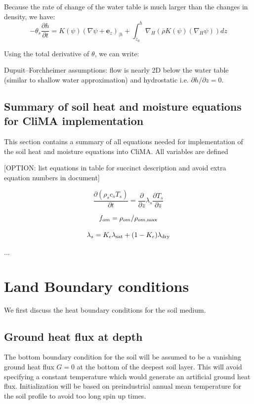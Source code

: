 \documentclass{article}
\begin{document}
Because the rate of change of the water table is much larger than the changes in density, we have: 
\begin{equation}
-	\theta_s \frac{\partial h}{\partial t} = 
 K(\psi) \left(\nabla \psi + {\mathbf e_z} \right)_{|h}  + \int_{z_0}^h  \nabla_H \left( {\overline \rho} K(\psi) \left(\nabla_H \psi \right) \right) dz
\end{equation}

Using the total derivative of $\theta$, we can write:


Dupuit–Forchheimer assumptions: flow is nearly 2D below the water table (similar to shallow water approximation) and hydrostatic i.e. $\partial h/\partial z=0$.

\subsection{Summary of soil heat and moisture equations for CliMA implementation}

This section contains a summary of all equations needed for implementation of the soil heat and moisture equations into CliMA. All variables are defined 

[OPTION: list equations in table for succinct description and avoid extra equation numbers in document]


\begin{equation}
     \frac{\partial (\rho_s c_s T_s) }{\partial t} = \frac{\partial }{\partial z}\lambda_s \frac{\partial T_s }{\partial z}
\end{equation}

\begin{equation}
    f_{om} = \rho_{om}/\rho_{om,{\rm max}}
\end{equation}


\begin{equation}
\lambda_s = K_e \lambda_{\rm sat} + (1-K_e) \lambda_{\rm dry}
\end{equation}


...



\section{Land Boundary conditions}
We first discuss the heat boundary conditions for the soil medium.
\subsection{Ground heat flux at depth}
The bottom boundary condition for the soil will be assumed to be a vanishing ground heat flux $G=0$ at the bottom of the deepest soil layer. This will avoid specifying a constant temperature which would generate an artificial ground heat flux. Initialization will be based on preindustrial annual mean temperature for the soil profile to avoid too long spin up times.
\end{document}
